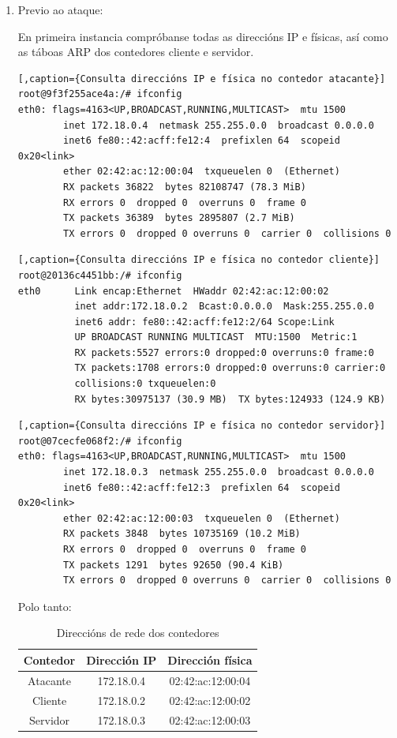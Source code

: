 \begin{enumerate}
\item Previo ao ataque:

En primeira instancia compróbanse todas as direccións IP e físicas, así como as táboas ARP dos contedores cliente e servidor.

\begin{lstlisting}[,caption={Consulta direccións IP e física no contedor atacante}]
root@9f3f255ace4a:/# ifconfig 
eth0: flags=4163<UP,BROADCAST,RUNNING,MULTICAST>  mtu 1500
        inet 172.18.0.4  netmask 255.255.0.0  broadcast 0.0.0.0
        inet6 fe80::42:acff:fe12:4  prefixlen 64  scopeid 0x20<link>
        ether 02:42:ac:12:00:04  txqueuelen 0  (Ethernet)
        RX packets 36822  bytes 82108747 (78.3 MiB)
        RX errors 0  dropped 0  overruns 0  frame 0
        TX packets 36389  bytes 2895807 (2.7 MiB)
        TX errors 0  dropped 0 overruns 0  carrier 0  collisions 0
\end{lstlisting}

\begin{lstlisting}[,caption={Consulta direccións IP e física no contedor cliente}]
root@20136c4451bb:/# ifconfig 
eth0      Link encap:Ethernet  HWaddr 02:42:ac:12:00:02  
          inet addr:172.18.0.2  Bcast:0.0.0.0  Mask:255.255.0.0
          inet6 addr: fe80::42:acff:fe12:2/64 Scope:Link
          UP BROADCAST RUNNING MULTICAST  MTU:1500  Metric:1
          RX packets:5527 errors:0 dropped:0 overruns:0 frame:0
          TX packets:1708 errors:0 dropped:0 overruns:0 carrier:0
          collisions:0 txqueuelen:0 
          RX bytes:30975137 (30.9 MB)  TX bytes:124933 (124.9 KB)
\end{lstlisting}

\begin{lstlisting}[,caption={Consulta direccións IP e física no contedor servidor}]
root@07cecfe068f2:/# ifconfig 
eth0: flags=4163<UP,BROADCAST,RUNNING,MULTICAST>  mtu 1500
        inet 172.18.0.3  netmask 255.255.0.0  broadcast 0.0.0.0
        inet6 fe80::42:acff:fe12:3  prefixlen 64  scopeid 0x20<link>
        ether 02:42:ac:12:00:03  txqueuelen 0  (Ethernet)
        RX packets 3848  bytes 10735169 (10.2 MiB)
        RX errors 0  dropped 0  overruns 0  frame 0
        TX packets 1291  bytes 92650 (90.4 KiB)
        TX errors 0  dropped 0 overruns 0  carrier 0  collisions 0
\end{lstlisting}

Polo tanto:

\begin{table}[H]
\centering
\caption{Direccións de rede dos contedores}
\label{direccions-rede}
\begin{tabular}{|c|c|c|}
\hline
Contedor & Dirección IP & Dirección física \\ \hline
Atacante & 172.18.0.4 & 02:42:ac:12:00:04 \\ \hline
Cliente & 172.18.0.2 & 02:42:ac:12:00:02 \\ \hline
Servidor & 172.18.0.3 & 02:42:ac:12:00:03 \\ \hline
\end{tabular}
\end{table}


\end{enumerate}
